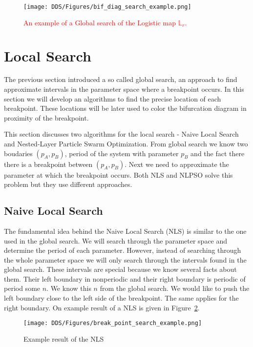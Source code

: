 \begin{figure}[!h]
    \centering
    \texttt{[image: DDS/Figures/bif\_diag\_search\_example.png]}
    \caption{
        \textcolor{red}{
        An example of a Global search of the Logistic map $\mathbb{L}_{r}$.
        }
    }
    \label{fig:bif_diag_search_example}
\end{figure}

\section{Local Search}
The previous section introduced a so called global search, an approach to find approximate intervals in the parameter space where a breakpoint occurs.
In this section we will develop an algorithms to find the precise location of each breakpoint.
These locations will be later used to color the bifurcation diagram in proximity of the breakpoint.
\par
This section discusses two algorithms for the local search - Naive Local Search and Nested-Layer Particle Swarm Optimization.
From global search we know two boudaries $(p_A, p_B)$, period of the system with parameter $p_B$ and the fact there there is a breakpoint between $(p_A, p_B)$.
Next we need to approximate the parameter at which the breakpoint occurs.
Both NLS and NLPSO solve this problem but they use different approaches.

\subsection{Naive Local Search}
The fundamental idea behind the Naive Local Search (NLS) is similar to the one used in the global search.
We will search through the parameter space and determine the period of each parameter.
However, instead of searching through the whole parameter space we will only search through the intervals found in the global search.
These intervals are special because we know several facts about them.
Their left boundary in nonperiodic and their right boundary is periodic of period some $n$. We know this $n$ from the global search.
We would like to push the left boundary close to the left side of the breakpoint.
The same applies for the right boundary.
On example result of a NLS is given in Figure~\ref{fig:break_point_search_example}.

\begin{figure}[!h]
    \centering
    \texttt{[image: DDS/Figures/break\_point\_search\_example.png]}
    \caption{Example result of the NLS}
    \label{fig:break_point_search_example}
\end{figure}




